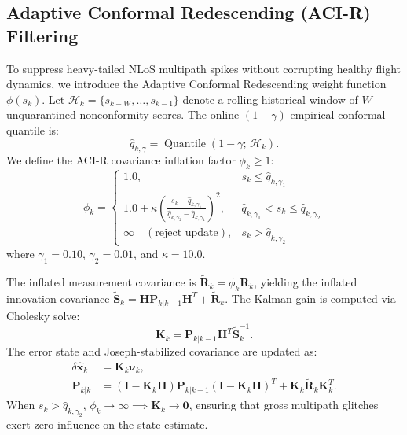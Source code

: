 \documentclass[journal,twocolumn]{IEEEtran}
\begin{document}
\subsection{Adaptive Conformal Redescending (ACI-R) Filtering}
To suppress heavy-tailed NLoS multipath spikes without corrupting healthy flight dynamics, we introduce the Adaptive Conformal Redescending weight function $\phi(s_k)$. Let $\mathcal{H}_k = \{s_{k-W}, \dots, s_{k-1}\}$ denote a rolling historical window of $W$ unquarantined nonconformity scores. The online $(1 - \gamma)$ empirical conformal quantile is:
\begin{equation}
    \hat{q}_{k, \gamma} = \operatorname{Quantile}\left(1 - \gamma;\, \mathcal{H}_k\right).
\end{equation}
We define the ACI-R covariance inflation factor $\phi_k \ge 1$:
\begin{equation}
    \phi_k = \begin{cases} 
        1.0, & s_k \le \hat{q}_{k, \gamma_1} \\
        1.0 + \kappa \left( \frac{s_k - \hat{q}_{k, \gamma_1}}{\hat{q}_{k, \gamma_2} - \hat{q}_{k, \gamma_1}} \right)^2, & \hat{q}_{k, \gamma_1} < s_k \le \hat{q}_{k, \gamma_2} \\
        \infty \quad (\text{reject update}), & s_k > \hat{q}_{k, \gamma_2}
    \end{cases}
    \label{eq:acir_inflation}
\end{equation}
where $\gamma_1 = 0.10$, $\gamma_2 = 0.01$, and $\kappa = 10.0$. 

The inflated measurement covariance is $\tilde{\mathbf{R}}_k = \phi_k \mathbf{R}_k$, yielding the inflated innovation covariance $\tilde{\mathbf{S}}_k = \mathbf{H} \mathbf{P}_{k|k-1} \mathbf{H}^T + \tilde{\mathbf{R}}_k$. The Kalman gain is computed via Cholesky solve:
\begin{equation}
    \mathbf{K}_k = \mathbf{P}_{k|k-1} \mathbf{H}^T \tilde{\mathbf{S}}_k^{-1}.
\end{equation}
The error state and Joseph-stabilized covariance are updated as:
\begin{align}
    \delta \hat{\mathbf{x}}_k &= \mathbf{K}_k \bm{\nu}_k, \\
    \mathbf{P}_{k|k} &= (\mathbf{I} - \mathbf{K}_k \mathbf{H}) \mathbf{P}_{k|k-1} (\mathbf{I} - \mathbf{K}_k \mathbf{H})^T + \mathbf{K}_k \tilde{\mathbf{R}}_k \mathbf{K}_k^T.
    \label{eq:joseph_update}
\end{align}
When $s_k > \hat{q}_{k, \gamma_2}$, $\phi_k \to \infty \implies \mathbf{K}_k \to \mathbf{0}$, ensuring that gross multipath glitches exert zero influence on the state estimate.
\end{document}

